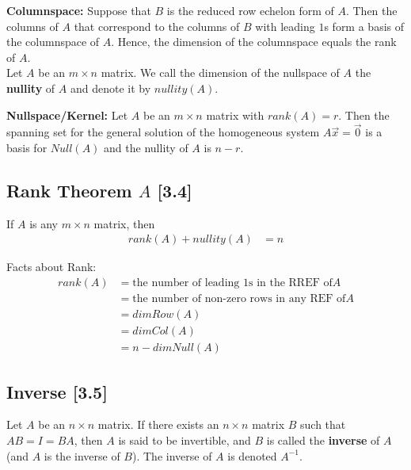 \documentclass[a4paper,9pt]{extarticle}
\begin{document}
\begin{multicols*}{2}
\textbf{Columnspace:} Suppose that $B$ is the reduced row echelon form of $A$. Then the columns of $A$ that correspond to the columns of $B$ with leading $1$s form a basis of the columnspace of $A$. Hence, the dimension of the columnspace equals the rank of $A$.\\

Let $A$ be an $m \times n$ matrix. We call the dimension of the nullspace of $A$ the \textbf{nullity} of $A$ and denote it by $nullity(A)$.

\textbf{Nullspace/Kernel:} Let $A$ be an $m \times n$ matrix with $rank(A) = r$. Then the spanning set for the general solution of the homogeneous system $A \vec{x} = \vec{0}$ is a basis for $Null(A)$ and the nullity of $A$ is $n - r$.


\subsection{Rank Theorem $A$ [3.4]}
If $A$ is any $m \times n$ matrix, then
\begin{equation} \label{3.4-5}
    \begin{split}
        rank(A) + nullity(A) & = n
    \end{split}
\end{equation}

Facts about Rank:
\begin{equation} \label{3.4-6}
    \begin{split}
        rank(A) & = \textrm{the number of leading 1s in the RREF of} A \\
        & = \textrm{the number of non-zero rows in any REF of} A \\
        & = dim Row(A) \\
        & = dim Col(A) \\
        & = n - dim Null(A)
    \end{split}
\end{equation}


\subsection{Inverse [3.5]}
Let $A$ be an $n \times n$ matrix. If there exists an $n \times n$ matrix $B$ such that $AB = I = BA$, then $A$ is said to be invertible, and $B$ is called the \textbf{inverse} of $A$ (and $A$ is the inverse of $B$). The inverse of $A$ is denoted $A^{-1}$. \\


\end{multicols*}
\end{document}
